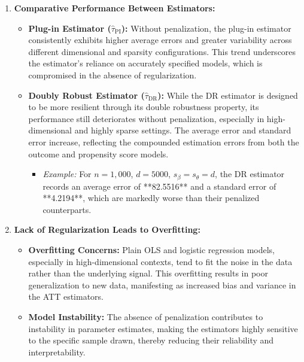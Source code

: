 \documentclass{article}
\begin{document}
\begin{enumerate}
  \item \textbf{Comparative Performance Between Estimators:}
    \begin{itemize}
      \item \textbf{Plug-in Estimator (\( \hat{\tau}_{\text{PI}} \)):} Without penalization, the plug-in estimator consistently exhibits higher average errors and greater variability across different dimensional and sparsity configurations. This trend underscores the estimator's reliance on accurately specified models, which is compromised in the absence of regularization.
      \item \textbf{Doubly Robust Estimator (\( \hat{\tau}_{\text{DR}} \)):} While the DR estimator is designed to be more resilient through its double robustness property, its performance still deteriorates without penalization, especially in high-dimensional and highly sparse settings. The average error and standard error increase, reflecting the compounded estimation errors from both the outcome and propensity score models.
        \begin{itemize}
          \item \textit{Example:} For \( n = 1,000 \), \( d = 5000 \), \( s_\beta = s_\theta = d \), the DR estimator records an average error of **82.5516** and a standard error of **4.2194**, which are markedly worse than their penalized counterparts.
        \end{itemize}
    \end{itemize}

  \item \textbf{Lack of Regularization Leads to Overfitting:}
    \begin{itemize}
      \item \textbf{Overfitting Concerns:} Plain OLS and logistic regression models, especially in high-dimensional contexts, tend to fit the noise in the data rather than the underlying signal. This overfitting results in poor generalization to new data, manifesting as increased bias and variance in the ATT estimators.
      \item \textbf{Model Instability:} The absence of penalization contributes to instability in parameter estimates, making the estimators highly sensitive to the specific sample drawn, thereby reducing their reliability and interpretability.
    \end{itemize}


\end{enumerate}
\end{document}
